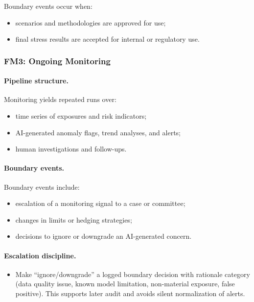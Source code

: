 Boundary events occur when:

\begin{itemize}
  \item scenarios and methodologies are approved for use;
  \item final stress results are accepted for internal or regulatory use.
\end{itemize}

\subsubsection*{FM3: Ongoing Monitoring}

\paragraph{Pipeline structure.}
Monitoring yields repeated runs over:

\begin{itemize}
  \item time series of exposures and risk indicators;
  \item AI-generated anomaly flags, trend analyses, and alerts;
  \item human investigations and follow-ups.
\end{itemize}

\paragraph{Boundary events.}
Boundary events include:

\begin{itemize}
  \item escalation of a monitoring signal to a case or committee;
  \item changes in limits or hedging strategies;
  \item decisions to ignore or downgrade an AI-generated concern.
\end{itemize}
\paragraph{Escalation discipline.}
\begin{itemize}
  \item Make “ignore/downgrade” a logged boundary decision with rationale category (data quality issue,
        known model limitation, non-material exposure, false positive). This supports later audit and avoids
        silent normalization of alerts.
\end{itemize}
